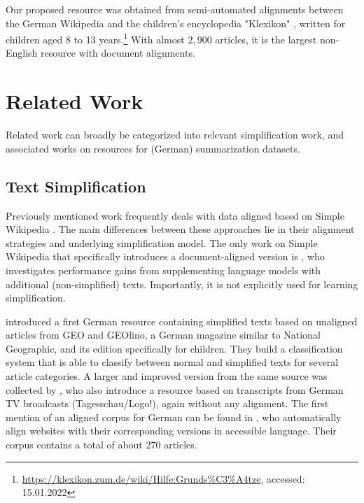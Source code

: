 \documentclass[10pt, a4paper]{article}
\begin{document}
Our proposed resource was obtained from semi-automated alignments between the German Wikipedia and the children's encyclopedia "Klexikon" \cite{schulte-dijk-2015-free}, written for children aged 8 to 13 years.\footnote{\url{https://klexikon.zum.de/wiki/Hilfe:Grunds\%C3\%A4tze}, accessed: 15.01.2022}
With almost $2{,}900$ articles, it is the largest non-English resource with document alignments.






\section{Related Work}
Related work can broadly be categorized into relevant simplification work, and associated works on resources for (German) summarization datasets.

\subsection{Text Simplification}
Previously mentioned work frequently deals with data aligned based on Simple Wikipedia \cite{zhu-etal-2010-monolingual,coster-kauchak-2011-simple,hwang-etal-2015-aligning}. The main differences between these approaches lie in their alignment strategies and underlying simplification model.
The only work on Simple Wikipedia that specifically introduces a document-aligned version is \cite{kauchak-2013-improving}, who investigates performance gains from supplementing language models with additional (non-simplified) texts. Importantly, it is not explicitly used for learning simplification.


\cite{hancke-etal-2012-readability} introduced a first German resource containing simplified texts based on unaligned articles from GEO and GEOlino, a German magazine similar to National Geographic, and its edition specifically for children.
They build a classification system that is able to classify between normal and simplified texts for several article categories.
A larger and improved version from the same source was collected by \cite{weiss-meurers-2018-modeling}, who also introduce a resource based on transcripts from German TV broadcasts (Tagesschau/Logo!), again without any alignment.
The first mention of an aligned corpus for German can be found in \cite{klaper-etal-2013-building}, who automatically align websites with their corresponding versions in accessible language. Their corpus contains a total of about 270 articles.
\end{document}
